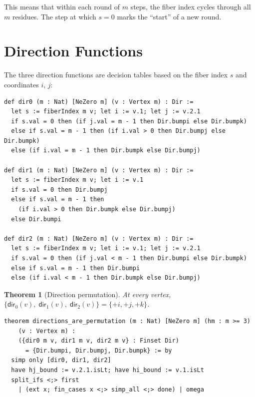 \documentclass[11pt,a4paper]{article}
\newtheorem{theorem}{Theorem}[section]
\begin{document}
This means that within each round of $m$ steps, the fiber index cycles through all
$m$ residues. The step at which $s = 0$ marks the ``start'' of a new round.

\section{Direction Functions}
\label{sec:directions}

The three direction functions are decision tables based on the fiber index $s$
and coordinates $i$, $j$:

\begin{lstlisting}[caption={The three direction functions}]
def dir0 (m : Nat) [NeZero m] (v : Vertex m) : Dir :=
  let s := fiberIndex m v; let i := v.1; let j := v.2.1
  if s.val = 0 then (if j.val = m - 1 then Dir.bumpi else Dir.bumpk)
  else if s.val = m - 1 then (if i.val > 0 then Dir.bumpj else Dir.bumpk)
  else (if i.val = m - 1 then Dir.bumpk else Dir.bumpj)

def dir1 (m : Nat) [NeZero m] (v : Vertex m) : Dir :=
  let s := fiberIndex m v; let i := v.1
  if s.val = 0 then Dir.bumpj
  else if s.val = m - 1 then
    (if i.val > 0 then Dir.bumpk else Dir.bumpj)
  else Dir.bumpi

def dir2 (m : Nat) [NeZero m] (v : Vertex m) : Dir :=
  let s := fiberIndex m v; let i := v.1; let j := v.2.1
  if s.val = 0 then (if j.val < m - 1 then Dir.bumpi else Dir.bumpk)
  else if s.val = m - 1 then Dir.bumpi
  else (if i.val < m - 1 then Dir.bumpk else Dir.bumpj)
\end{lstlisting}

\begin{theorem}[Direction permutation]
At every vertex, $\{\mathsf{dir}_0(v),\;\mathsf{dir}_1(v),\;\mathsf{dir}_2(v)\}
= \{+i, +j, +k\}$.
\end{theorem}

\begin{lstlisting}[caption={Permutation property}]
theorem directions_are_permutation (m : Nat) [NeZero m] (hm : m >= 3)
    (v : Vertex m) :
    ({dir0 m v, dir1 m v, dir2 m v} : Finset Dir)
      = {Dir.bumpi, Dir.bumpj, Dir.bumpk} := by
  simp only [dir0, dir1, dir2]
  have hj_bound := v.2.1.isLt; have hi_bound := v.1.isLt
  split_ifs <;> first
    | (ext x; fin_cases x <;> simp_all <;> done) | omega
\end{lstlisting}

\end{document}
